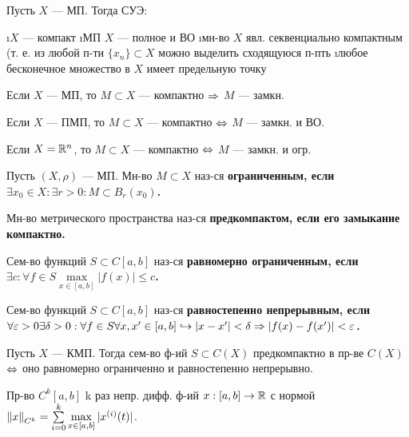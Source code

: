 \begin{thm}
Пусть $X$ --- МП. Тогда СУЭ:
\begin{enumerate}
\i $X$ --- компакт
\i МП $X$ --- полное и ВО
\i мн-во $X$ явл. секвенциально компактным (т. е. из любой п-ти $\{x_n\} \subset X$ можно выделить сходящуюся п-пть
\i любое бесконечное множество в $X$ имеет предельную точку
\end{enumerate} 
\end{thm}
\begin{cor}
Если $X$ --- МП, то $M \subset X$ --- компактно $\Rightarrow$ $M$ --- замкн.
\end{cor}
\begin{cor}
Если $X$ --- ПМП, то $M \subset X$ --- компактно $\Leftrightarrow$ $M$ --- замкн. и ВО.
\end{cor}
\begin{cor}
Если $X = \mathbb{R}^n$, то $M \subset X$ --- компактно $\Leftrightarrow$ $M$ --- замкн. и огр.
\end{cor}

\begin{defn}
Пусть $(X, \rho)$ --- МП. Мн-во $M \subset X$ наз-ся \bf{ограниченным}, если $\exists x_0 \in X: \exists r > 0: M \subset B_r(x_0)$.
\end{defn}

\begin{defn}
Мн-во метрического пространства наз-ся \bf{предкомпактом}, если его замыкание компактно.
\end{defn}

\begin{defn}
Сем-во функций $S \subset C[a, b]$ наз-ся \bf{равномерно ограниченным}, если $\exists c: \forall f \in S \max\limits_{x \in [a, b]} |f(x)| \le c$.
\end{defn}

\begin{defn}
Сем-во функций $S \subset C[a, b]$ наз-ся \bf{равностепенно непрерывным}, если $\forall \varepsilon > 0 \exists \delta > 0: \forall f \in S \forall x, x' \in [a, b] \hookrightarrow |x-x'| < \delta \Rightarrow |f(x)-f(x')| < \varepsilon$.
\end{defn}

\begin{thm}
Пусть $X$ --- КМП. Тогда сем-во ф-ий $S \subset C(X)$ предкомпактно в пр-ве $C(X)$ $\Leftrightarrow$ оно равномерно ограниченно и равностепенно непрерывно.
\end{thm}

\begin{defn}
Пр-во $C^k[a, b]$ k раз непр. дифф. ф-ий $x:[a, b] \rightarrow \mathbb{R}$ с нормой $\left\lVert x\right\rVert_{C^k} = \sum\limits_{i=0}^k \max\limits_{x \in [a, b]} |x^{(i)}(t)|$.
\end{defn}

